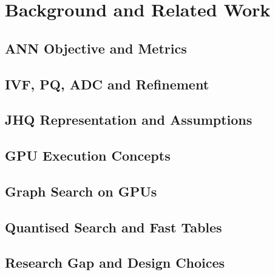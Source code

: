 \chapter{Background and Related Work}
\label{ch:background}


\section{ANN Objective and Metrics}
\label{sec:2-1}


\section{IVF, PQ, ADC and Refinement}
\label{sec:2-2}


\section{JHQ Representation and Assumptions}
\label{sec:2-3}


\section{GPU Execution Concepts}
\label{sec:2-4}


\section{Graph Search on GPUs}
\label{sec:2-5}


\section{Quantised Search and Fast Tables}
\label{sec:2-6}


\section{Research Gap and Design Choices}
\label{sec:2-7}

